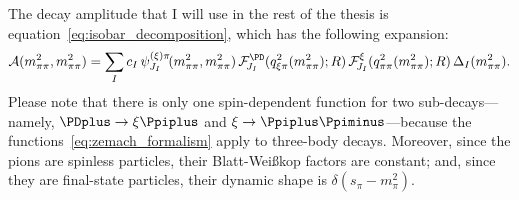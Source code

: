     The decay amplitude that I will use in the rest of the thesis is equation~\eqref{eq:isobar_decomposition}, which has the following expansion:
    \begin{equation}
        \A(m_{\pi\pi}^2, m_{\pi\pi}^2) = \sum_{I} c_I \,\psi_{J_I}^{(\xi)\pi}\!(m_{\pi\pi}^2, m_{\pi\pi}^2)\, \mathcal{F}_{\!J_I}^{\PD}(q_{\xi\pi}^2(m_{\pi\pi}^2);R) \, \mathcal{F}_{\!J_I}^{\xi}(q_{\pi\pi}^2(m_{\pi\pi}^2);R)\,\Delta_I(m_{\pi\pi}^2).
    \end{equation}
    Please note that there is only one spin-dependent function for two sub-decays---namely, $\PDplus\to\xi\Ppiplus$ and $\xi\to\Ppiplus\Ppiminus$---because the functions~\eqref{eq:zemach_formalism} apply to three-body decays.
    Moreover, since the pions are spinless particles, their Blatt-Wei\ss{}kop factors are constant; and, since they are final-state particles, their dynamic shape is $\delta(s_{\pi}-m_{\pi}^2)$.
